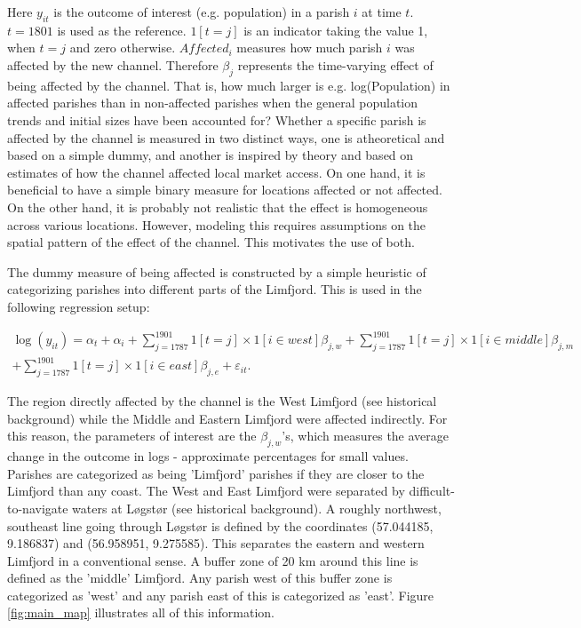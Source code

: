 \documentclass[11pt]{article}
\begin{document}
Here $y_{it}$ is the outcome of interest (e.g. population) in a parish $i$ at time $t$. $t=1801$ is used as the reference. $1[t=j]$ is an indicator taking the value 1, when $t=j$ and zero otherwise. $Affected_{i}$ measures how much parish $i$ was affected by the new channel. Therefore $\beta_j$ represents the time-varying effect of being affected by the channel. That is, how much larger is e.g. log(Population) in affected parishes than in non-affected parishes when the general population trends and initial sizes have been accounted for? Whether a specific parish is affected by the channel is measured in two distinct ways, one is atheoretical and based on a simple dummy, and another is inspired by theory and based on estimates of how the channel affected local market access. On one hand, it is beneficial to have a simple binary measure for locations affected or not affected. On the other hand, it is probably not realistic that the effect is homogeneous across various locations. However, modeling this requires assumptions on the spatial pattern of the effect of the channel. This motivates the use of both.

The dummy measure of being affected is constructed by a simple heuristic of categorizing parishes into different parts of the Limfjord. This is used in the following regression setup: 

\begin{equation}
\label{eq:eq502}
\begin{split}
\log(y_{it})= \alpha_t + \alpha_i + \sum_{j=1787}^{1901} 1[t=j] \times 1[i\in west]\beta_{j,w} + \sum_{j=1787}^{1901} 1[t=j] \times 1[i\in middle]\beta_{j,m} \\
+ \sum_{j=1787}^{1901} 1[t=j] \times 1[i\in east]\beta_{j,e} + \varepsilon_{it}.
\end{split}
\end{equation}

The region directly affected by the channel is the West Limfjord (see historical background) while the Middle and Eastern Limfjord were affected indirectly. For this reason, the parameters of interest are the $\beta_{j,w}$'s, which measures the average change in the outcome in logs - approximate percentages for small values. Parishes are categorized as being 'Limfjord' parishes if they are closer to the Limfjord than any coast. The West and East Limfjord were separated by difficult-to-navigate waters at Løgstør (see historical background). A roughly northwest, southeast line going through Løgstør is defined by the coordinates (57.044185, 9.186837) and (56.958951, 9.275585). This separates the eastern and western Limfjord in a conventional sense. A buffer zone of 20 km around this line is defined as the 'middle' Limfjord. Any parish west of this buffer zone is categorized as 'west' and any parish east of this is categorized as 'east'. Figure \ref{fig:main_map} illustrates all of this information.
\end{document}

